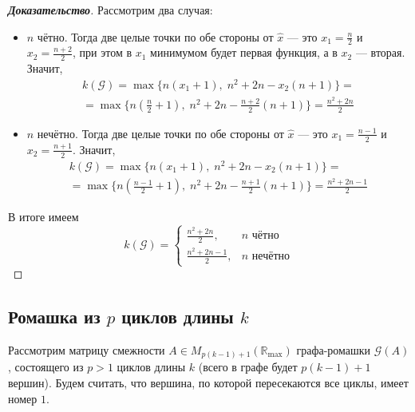 \documentclass[12pt]{article}
\begin{document}
\begin{proof}[\textbf{Доказательство}]
Рассмотрим два случая: \begin{itemize}
\item $n$ чётно. Тогда две целые точки по обе стороны от $\hat{x}$ --- это $x_1 = \frac{n}{2}$ и $x_2 = \frac{n + 2}{2}$, при этом в $x_1$ минимумом будет первая функция, а в $x_2$ --- вторая. Значит, \begin{multline*}
k(\mathcal{G}) = \max \{n(x_1+1),\; n^2 + 2n - x_2(n+1) \} =\\= \max \{n(\frac{n}{2}+1),\; n^2 + 2n - \frac{n + 2}{2}(n+1) \} = \frac{n^2+2n}{2}
\end{multline*}
\item $n$ нечётно. Тогда две целые точки по обе стороны от $\hat{x}$ --- это $x_1 = \frac{n-1}{2}$ и $x_2 = \frac{n + 1}{2}$. Значит, \begin{multline*}
k(\mathcal{G}) = \max \{n(x_1+1),\; n^2 + 2n - x_2(n+1) \} =\\= \max \{n(\frac{n-1}{2}+1),\; n^2 + 2n - \frac{n + 1}{2}(n+1) \} = \frac{n^2+2n-1}{2}
\end{multline*}
\end{itemize}
В итоге имеем \begin{equation*}
k(\mathcal{G}) = \begin{cases}
        \frac{n^2 + 2n}{2},     & n \text{ чётно} \\
        \frac{n^2 + 2n - 1}{2}, & n \text{ нечётно}
    \end{cases}
\end{equation*}
\end{proof} 

\subsection{ Ромашка из $p$ циклов длины $k$}
Рассмотрим матрицу смежности $A \in M_{p(k - 1) + 1}(\mathbb{R}_{\max})$ графа-ромашки $\mathcal{G}(A)$, состоящего из $p > 1$ циклов длины $k$ (всего в графе будет $p(k - 1) + 1$ вершин). Будем считать, что вершина, по которой пересекаются все циклы, имеет номер $1$.
\end{document}
